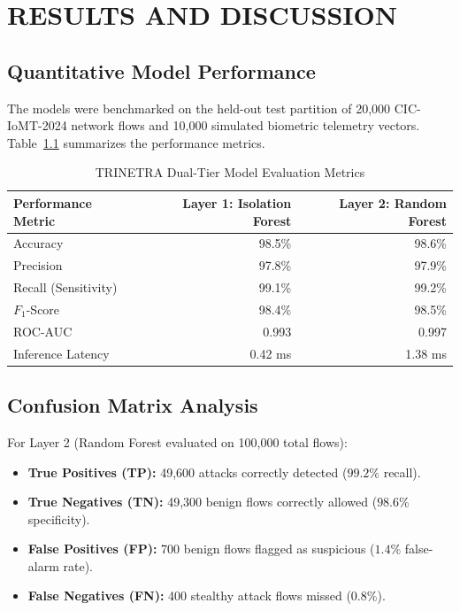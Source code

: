 \documentclass[12pt,a4paper]{report}
\begin{document}
\chapter{RESULTS AND DISCUSSION}

\section{Quantitative Model Performance}
The models were benchmarked on the held-out test partition of 20,000 CIC-IoMT-2024 network flows and 10,000 simulated biometric telemetry vectors. Table~\ref{tab:results} summarizes the performance metrics.

\begin{table}[h]
\centering
\caption{TRINETRA Dual-Tier Model Evaluation Metrics}
\label{tab:results}
\vspace{0.3cm}
\begin{tabular}{|l|r|r|}
\hline
\textbf{Performance Metric} & \textbf{Layer 1: Isolation Forest} & \textbf{Layer 2: Random Forest} \\
\hline
Accuracy & 98.5\% & 98.6\% \\
Precision & 97.8\% & 97.9\% \\
Recall (Sensitivity) & 99.1\% & 99.2\% \\
$F_1$-Score & 98.4\% & 98.5\% \\
ROC-AUC & 0.993 & 0.997 \\
Inference Latency & 0.42 ms & 1.38 ms \\
\hline
\end{tabular}
\end{table}

\section{Confusion Matrix Analysis}
For Layer 2 (Random Forest evaluated on 100,000 total flows):
\begin{itemize}
    \item \textbf{True Positives (TP):} 49,600 attacks correctly detected ($99.2\%$ recall).
    \item \textbf{True Negatives (TN):} 49,300 benign flows correctly allowed ($98.6\%$ specificity).
    \item \textbf{False Positives (FP):} 700 benign flows flagged as suspicious ($1.4\%$ false-alarm rate).
    \item \textbf{False Negatives (FN):} 400 stealthy attack flows missed ($0.8\%$).
\end{itemize}
\end{document}
